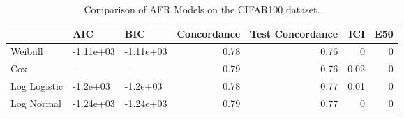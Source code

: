 \begin{table*}
\centering
\caption{Comparison of AFR Models on the CIFAR100 dataset.}
\label{tab:cifar100}
\begin{tabular}{lllrrrr}
\toprule
 & AIC & BIC & Concordance & Test Concordance & ICI & E50 \\
\midrule
Weibull & -1.11e+03 & -1.11e+03 & 0.78 & 0.76 & 0 & 0 \\
Cox & -- & -- & 0.79 & 0.76 & 0.02 & 0 \\
Log Logistic & -1.2e+03 & -1.2e+03 & 0.78 & 0.77 & 0.01 & 0 \\
Log Normal & -1.24e+03 & -1.24e+03 & 0.79 & 0.77 & 0 & 0 \\
\bottomrule
\end{tabular}
\end{table*}
